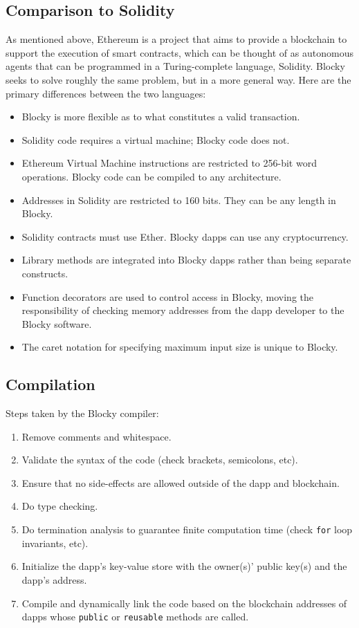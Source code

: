 \documentclass[letterpaper]{article}
\begin{document}
\subsection{Comparison to Solidity}
As mentioned above, Ethereum is a project that aims to provide a blockchain to support the execution of smart contracts, which can be thought of as autonomous agents that can be programmed in a Turing-complete language, Solidity. Blocky seeks to solve roughly the same problem, but in a more general way. Here are the primary differences between the two languages:
\begin{itemize}
  \item{Blocky is more flexible as to what constitutes a valid transaction.}
  \item{Solidity code requires a virtual machine\cite{ethereum15}; Blocky code does not.}
  \item{Ethereum Virtual Machine instructions are restricted to 256-bit word operations\cite{ethereum15}. Blocky code can be compiled to any architecture.}
  \item{Addresses in Solidity are restricted to 160 bits\cite{ethereum15}. They can be any length in Blocky.}
  \item{Solidity contracts must use Ether\cite{ethereum15}. Blocky dapps can use any cryptocurrency.}
  \item{Library methods are integrated into Blocky dapps rather than being separate constructs.}
  \item{Function decorators are used to control access in Blocky, moving the responsibility of checking memory addresses from the dapp developer to the Blocky software.}
  \item{The caret notation for specifying maximum input size is unique to Blocky.}
\end{itemize}

\subsection{Compilation}
Steps taken by the Blocky compiler:
\begin{enumerate}
  \item{Remove comments and whitespace.}
  \item{Validate the syntax of the code (check brackets, semicolons, etc).}
  \item{Ensure that no side-effects are allowed outside of the dapp and blockchain.}
  \item{Do type checking.}
  \item{Do termination analysis to guarantee finite computation time (check \texttt{for} loop invariants, etc).}
  \item{Initialize the dapp's key-value store with the owner(s)' public key(s) and the dapp's address.}
  \item{Compile and dynamically link the code based on the blockchain addresses of dapps whose \texttt{public} or \texttt{reusable} methods are called.}
\end{enumerate}
\end{document}
